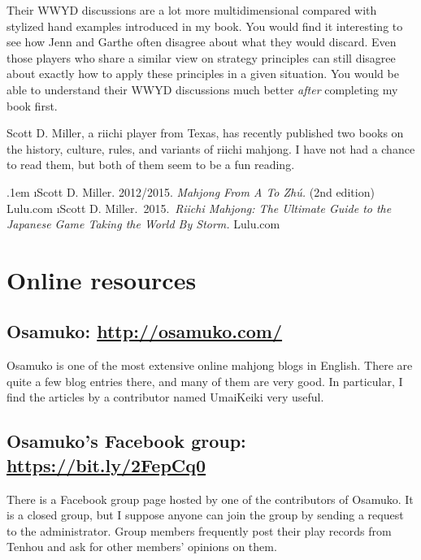 \bigskip
Their WWYD discussions are a lot more multidimensional compared with stylized hand examples introduced in my book. You would find it interesting to see how Jenn and Garthe often disagree about what they would discard. Even those players who share a similar view on strategy principles can still disagree about exactly how to apply these principles in a given situation. 
You would be able to understand their WWYD discussions much better \emph{after} completing my book first. 

\bigskip
Scott D. Miller, a riichi player from Texas, has recently published two books on the history, culture, rules, and variants of riichi mahjong. I have not had a chance to read them, but both of them seem to be a fun reading. 

\be\itemsep.1em \setcounter{enumi}{5}
\i Scott D. Miller. 2012/2015. \textit{Mahjong From A To Zh\'{u}.} (2nd edition) Lulu.com
\i Scott D. Miller.~2015.~\textit{Riichi Mahjong: The Ultimate Guide to the \linebreak Japanese Game Taking the World By Storm.} Lulu.com
\ee


\newpage
\section{Online resources}

\subsection*{Osamuko: \url{http://osamuko.com/}} 
Osamuko is one of the most extensive online mahjong blogs in English. There are quite a few blog entries there, and many of them are very good. In particular, I find the articles by a contributor named \linebreak UmaiKeiki very useful. 

\subsection*{Osamuko's Facebook group: \url{https://bit.ly/2FepCq0}}
There is a Facebook group page hosted by one of the contributors of Osamuko. It is a closed group, but I suppose anyone can join the group by sending a request to the administrator. Group members frequently post their play records from {\jap Tenhou} and ask for other members' opinions on them. 

